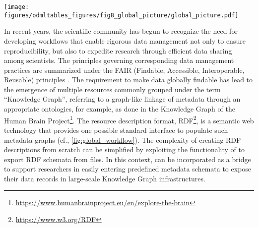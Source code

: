 \begin{sidewaysfigure}[hbtp]
\begin{center}
\texttt{[image: figures/odmltables\_figures/fig8\_global\_picture/global\_picture.pdf]}
\caption[Integrating  and other software tools in the different stages of an experiment from preparation to publication]{\label{fig:global_workflow}
\textbf{Integrating  and other software tools in the different stages of an experiment from preparation to publication.} During the preparation of an experiment  in combination with spreadsheet software is used to develop an experiment specific structure of the metadata collection (templates, \fgenerate{}). During the execution and documentation of the experiment,  converts (\fconvert{}) between the tabular and  representations. The compare functionality (\fcompare{}) is used to generate overviews of  Properties across different Sections of a metadata collection. The filter (\ffilter{}) and merge (\fmerge{}) functionalities are used to create and merge subsets of  collections, respectively. For analysis and sharing, data can be represented using the  framework and annotated with metadata from the  metadata collection using custom scripts. This combined representation can be saved in a single format using the NIX framework, e.g., to share of data and metadata via a database. In parallel, metadata collections can be incorporated in databases, for example using an export of the  to the RDF standard.}
\end{center}
\end{sidewaysfigure}

In recent years, the scientific community has begun to recognize the need for developing workflows that enable rigorous data management not only to ensure reproducibility, but also to expedite research through efficient data sharing among scientists. The principles governing corresponding data management practices are summarized under the FAIR (Findable, Accessible, Interoperable, Reusable) principles \citep{Wilkinson_2016}. The requirement to make data globally findable has lead to the emergence of multiple resources commonly grouped under the term ``Knowledge Graph'', referring to a graph-like linkage of metadata through an appropriate ontologies, for example, as done in the Knowledge Graph of the Human Brain Project\footnote{\url{https://www.humanbrainproject.eu/en/explore-the-brain}}. The resource description format, RDF\footnote{\url{https://www.w3.org/RDF}}, is a semantic web technology that provides one possible standard interface to populate such metadata graphs (cf., \cref{fig:global_workflow}). The complexity of creating RDF descriptions from scratch can be simplified by exploiting the functionality of  to export RDF schemata from  files. In this context,  can be incorporated as a bridge to support researchers in easily entering predefined metadata schemata to expose their data records in large-scale Knowledge Graph infrastructures.

